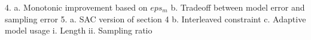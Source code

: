 4.  a. Monotonic improvement based on $eps_m$
    b. Tradeoff between model error and sampling error 
5.  a. SAC version of section 4
    b. Interleaved constraint
    c. Adaptive model usage
        i. Length
        ii. Sampling ratio